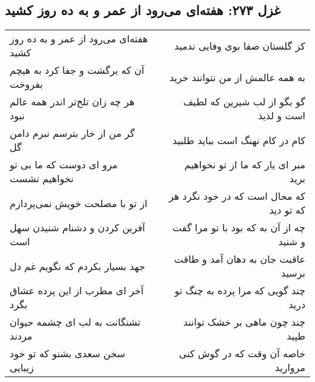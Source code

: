 \begin{center}
\section*{غزل ۲۷۳: هفته‌ای می‌رود از عمر و به ده روز کشید}
\label{sec:273}
\begin{longtable}{l p{0.5cm} r}
هفته‌ای می‌رود از عمر و به ده روز کشید
&&
کز گلستان صفا بوی وفایی ندمید
\\
آن که برگشت و جفا کرد به هیچم بفروخت
&&
به همه عالمش از من نتوانند خرید
\\
هر چه زان تلخ‌تر اندر همه عالم نبود
&&
گو بگو از لب شیرین که لطیف است و لذیذ
\\
گر من از خار بترسم نبرم دامن گل
&&
کام در کام نهنگ است بباید طلبید
\\
مرو ای دوست که ما بی تو نخواهیم نشست
&&
مبر ای یار که ما از تو نخواهیم برید
\\
از تو با مصلحت خویش نمی‌پردازم
&&
که محال است که در خود نگرد هر که تو دید
\\
آفرین کردن و دشنام شنیدن سهل است
&&
چه از آن به که بود با تو مرا گفت و شنید
\\
جهد بسیار بکردم که نگویم غم دل
&&
عاقبت جان به دهان آمد و طاقت برسید
\\
آخر ای مطرب از این پرده عشاق بگرد
&&
چند گویی که مرا پرده به چنگ تو درید
\\
تشنگانت به لب ای چشمه حیوان مردند
&&
چند چون ماهی بر خشک توانند طپید
\\
سخن سعدی بشنو که تو خود زیبایی
&&
خاصه آن وقت که در گوش کنی مروارید
\\
\end{longtable}
\end{center}
